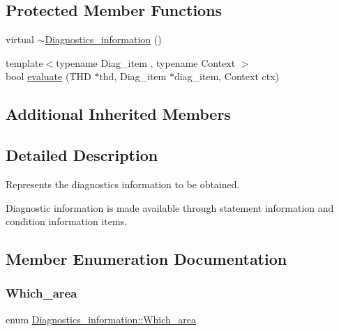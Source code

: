 \subsection*{Protected Member Functions}
\begin{DoxyCompactItemize}
\item 
virtual \mbox{\hyperlink{classDiagnostics__information_a36e371a6a611551e83ce8e331c8c1541}{$\sim$\+Diagnostics\+\_\+information}} ()
\item 
{\footnotesize template$<$typename Diag\+\_\+item , typename Context $>$ }\\bool \mbox{\hyperlink{classDiagnostics__information_a76edbb6f3462e7e236d71496c8b09094}{evaluate}} (T\+HD $\ast$thd, Diag\+\_\+item $\ast$diag\+\_\+item, Context ctx)
\end{DoxyCompactItemize}
\subsection*{Additional Inherited Members}


\subsection{Detailed Description}
Represents the diagnostics information to be obtained.

Diagnostic information is made available through statement information and condition information items. 

\subsection{Member Enumeration Documentation}
\mbox{\label{classDiagnostics__information_a87e497725c87366dd3af8cafe74fc624}} 
\subsubsection{\texorpdfstring{Which\+\_\+area}{Which\_area}}
{\footnotesize\ttfamily enum \mbox{\hyperlink{classDiagnostics__information_a87e497725c87366dd3af8cafe74fc624}{Diagnostics\+\_\+information\+::\+Which\+\_\+area}}}

